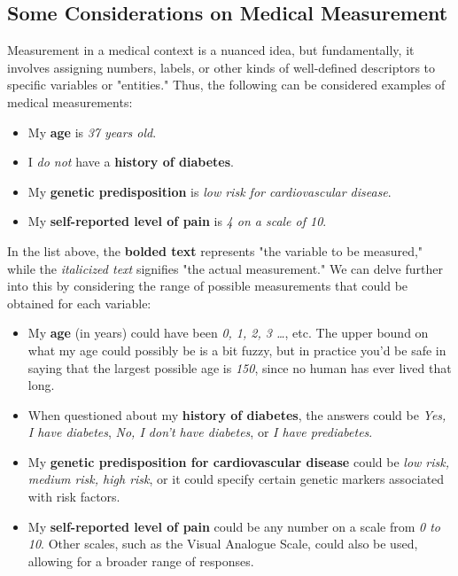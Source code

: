 \subsection{Some Considerations on Medical Measurement}

Measurement in a medical context is a nuanced idea, but fundamentally, it involves assigning numbers, labels, or other kinds of well-defined descriptors to specific variables or "entities." Thus, the following can be considered examples of medical measurements:

\begin{itemize} \itemsep 0pt
\item My \textbf{age} is \textit{37 years old}.
\item I \textit{do not} have a \textbf{history of diabetes}.
\item My \textbf{genetic predisposition} is \textit{low risk for cardiovascular disease}.
\item My \textbf{self-reported level of pain} is \textit{4 on a scale of 10}.
\end{itemize}


In the list above, the \textbf{bolded text} represents "the variable to be measured," while the \textit{italicized text} signifies "the actual measurement." We can delve further into this by considering the range of possible measurements that could be obtained for each variable:

\begin{itemize}
\item My {\bf age} (in years) could have been {\it 0, 1, 2, 3 \ldots}, etc. The upper bound on what my age could possibly be is a bit fuzzy, but in practice you'd be safe in saying that the largest possible age is {\it 150}, since no human has ever lived that long.
\item When questioned about my \textbf{history of diabetes}, the answers could be \textit{Yes, I have diabetes}, \textit{No, I don't have diabetes}, or \textit{I have prediabetes}. 
\item My \textbf{genetic predisposition for cardiovascular disease} could be \textit{low risk, medium risk, high risk}, or it could specify certain genetic markers associated with risk factors.
\item My \textbf{self-reported level of pain} could be any number on a scale from \textit{0 to 10}. Other scales, such as the Visual Analogue Scale, could also be used, allowing for a broader range of responses.
\end{itemize}


